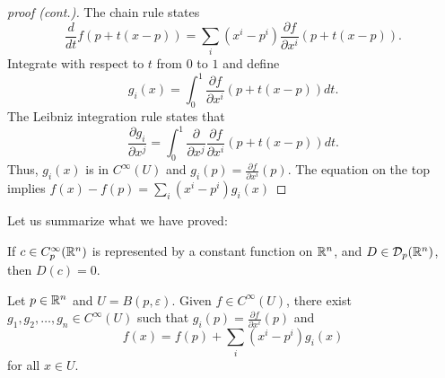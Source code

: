 \begin{frame}
  \begin{proof}[proof (cont.)]
    The chain rule states
    \begin{displaymath}
      \frac{d}{dt} f(p + t(x-p))
      = \sum_i (x^i - p^i) \frac{\partial f}{\partial x^i}(p + t(x - p)).
    \end{displaymath}
    Integrate with respect to $t$ from $0$ to $1$ and define
    \begin{displaymath}
      g_i(x) = \int_0^1 \frac{\partial f}{\partial x^i} (p + t(x - p)) dt.
    \end{displaymath}
    The Leibniz integration rule states that
    \begin{displaymath}
      \frac{\partial g_i}{\partial x^j} =
      \int_0^1 \frac{\partial}{\partial x^j}\frac{\partial f}{\partial x^i} (p + t(x - p)) dt.
    \end{displaymath}
    Thus, $g_i(x)$ is in $C^{\infty}(U)$ and $g_i(p) = \frac{\partial
    f}{\partial x^i}(p)$. The equation on the top implies $f(x) - f(p) = \sum_i
    (x^i - p^i)g_i(x)$
  \end{proof}
\end{frame}

\begin{frame}
  Let us summarize what we have proved:
  \begin{lemma}
    If $c \in C^{\infty}_p(\mathbb R^n)$ is represented by a constant function on 
    $\mathbb R^n$, and $D \in {\mathcal D}_p(\mathbb R^n)$, then $D(c) = 0$.
  \end{lemma}
  \begin{lemma}
    Let $p \in \mathbb R^n$ and $U = B(p, \varepsilon)$. Given $f \in C^{\infty}(U)$,
    there exist $g_1, g_2, \dots, g_n \in C^{\infty}(U)$ such that 
    $g_i(p) = \frac{\partial f}{\partial x^i}(p)$ and
    \begin{displaymath}
      f(x) = f(p) + \sum_{i} (x^i - p^i) g_i(x)
    \end{displaymath}
    for all $x \in U$.
  \end{lemma}
\end{frame}


